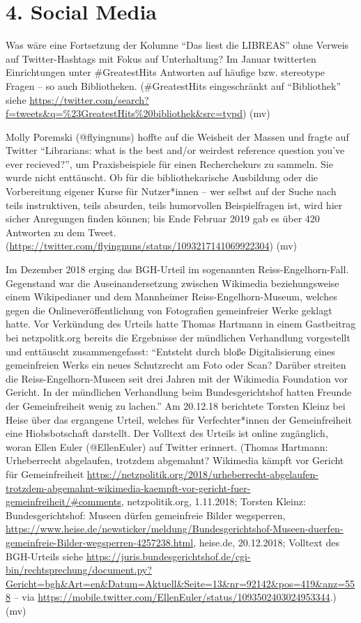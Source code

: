 \documentclass[a4paper,
fontsize=11pt,
oneside,
numbers=noperiodatend,
parskip=half-,
bibliography=totoc,
final
]{scrartcl}
\begin{document}
\hypertarget{social-media}{%
\section{4. Social Media}\label{social-media}}

Was wäre eine Fortsetzung der Kolumne \enquote{Das liest die LIBREAS}
ohne Verweis auf Twitter-Hashtags mit Fokus auf Unterhaltung? Im Januar
twitterten Einrichtungen unter \#GreatestHits Antworten auf häufige bzw.
stereotype Fragen -- so auch Bibliotheken. (\#GreatestHits eingeschränkt
auf \enquote{Bibliothek} siehe
\url{https://twitter.com/search?f=tweets\&q=\%23GreatestHits\%20bibliothek\&src=typd})
(mv)

Molly Poremski (@flyingnuns) hoffte auf die Weisheit der Massen und
fragte auf Twitter \enquote{Librarians: what is the best and/or weirdest
reference question you've ever recieved?}, um Praxisbeispiele für einen
Recherchekurs zu sammeln. Sie wurde nicht enttäuscht. Ob für die
bibliothekarische Ausbildung oder die Vorbereitung eigener Kurse für
Nutzer*innen -- wer selbst auf der Suche nach teils instruktiven, teils
absurden, teils humorvollen Beispielfragen ist, wird hier sicher
Anregungen finden können; bis Ende Februar 2019 gab es über 420
Antworten zu dem Tweet.
(\url{https://twitter.com/flyingnuns/status/1093217141069922304}) (mv)

Im Dezember 2018 erging das BGH-Urteil im sogenannten
Reiss-Engelhorn-Fall. Gegenstand war die Auseinandersetzung zwischen
Wikimedia beziehungsweise einem Wikipedianer und dem Mannheimer
Reiss-Engelhorn-Museum, welches gegen die Onlineveröffentlichung von
Fotografien gemeinfreier Werke geklagt hatte. Vor Verkündung des Urteils
hatte Thomas Hartmann in einem Gastbeitrag bei netzpolitk.org bereits
die Ergebnisse der mündlichen Verhandlung vorgestellt und enttäuscht
zusammengefasst: \enquote{Entsteht durch bloße Digitalisierung eines
gemeinfreien Werks ein neues Schutzrecht am Foto oder Scan? Darüber
streiten die Reiss-Engelhorn-Museen seit drei Jahren mit der Wikimedia
Foundation vor Gericht. In der mündlichen Verhandlung beim
Bundesgerichtshof hatten Freunde der Gemeinfreiheit wenig zu lachen.} Am
20.12.18 berichtete Torsten Kleinz bei Heise über das ergangene Urteil,
welches für Verfechter*innen der Gemeinfreiheit eine Hiobsbotschaft
darstellt. Der Volltext des Urteils ist online zugänglich, woran Ellen
Euler (@EllenEuler) auf Twitter erinnert. (Thomas Hartmann: Urheberrecht
abgelaufen, trotzdem abgemahnt? Wikimedia kämpft vor Gericht für
Gemeinfreiheit
\url{https://netzpolitik.org/2018/urheberrecht-abgelaufen-trotzdem-abgemahnt-wikimedia-kaempft-vor-gericht-fuer-gemeinfreiheit/\#comments},
netzpolitik.org, 1.11.2018; Torsten Kleinz: Bundesgerichtshof: Museen
dürfen gemeinfreie Bilder wegsperren,
\url{https://www.heise.de/newsticker/meldung/Bundesgerichtshof-Museen-duerfen-gemeinfreie-Bilder-wegsperren-4257238.html},
heise.de, 20.12.2018; Volltext des BGH-Urteils siehe
\url{https://juris.bundesgerichtshof.de/cgi-bin/rechtsprechung/document.py?Gericht=bgh\&Art=en\&Datum=Aktuell\&Seite=13\&nr=92142\&pos=419\&anz=558}
-- via
\url{https://mobile.twitter.com/EllenEuler/status/1093502403024953344}.)
(mv)
\end{document}
